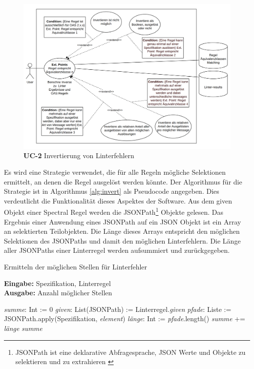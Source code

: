 \begin{figure}[htbp]
  \centering
  \includegraphics[width=1\linewidth]{img/invert.png}
  \caption{\textbf{UC-2} Invertierung von Linterfehlern}
  \label{fig:UC2}
\end{figure}

\newpage
Es wird eine Strategie verwendet, die für alle Regeln mögliche Selektionen ermittelt, an denen die Regel ausgelöst werden könnte. Der Algorithmus für die Strategie ist in Algorithmus \ref{alg:invert} als Pseudocode angegeben. Dies verdeutlicht die Funktionalität dieses Aspektes der Software. Aus dem given Objekt einer Spectral Regel werden die JSONPath\footnote{JSONPath ist eine deklarative Abfragesprache, \acs{JSON} Werte und Objekte zu selektieren und zu extrahieren \parencite{friesen_extracting_2019}} Objekte gelesen. Das Ergebnis einer Anwendung eines JSONPath auf ein \acs{JSON} Objekt ist ein Array an selektierten Teilobjekten. Die Länge dieses Arrays entspricht den möglichen Selektionen des JSONPaths und damit den möglichen Linterfehlern. Die Länge aller JSONPaths einer Linterregel werden aufsummiert und zurückgegeben.

\begin{algorithm}
  \caption{Ermitteln der möglichen Stellen für Linterfehler}
  \label{alg:invert}
  \textbf{Eingabe:} Spezifikation, Linterregel \\
  \textbf{Ausgabe:} Anzahl möglicher Stellen
\begin{algorithmic}[1]
    \State \textit{summe}: Int := 0
    \State \textit{given}: List(JSONPath) := Linterregel.\textit{given}
        \State \textit{pfade}: Liste := JSONPath.apply(Spezifikation, \textit{element})
        \State \textit{länge}: Int := \textit{pfade}.length()
        \State \textit{summe} += \textit{länge}
    \EndFor
    \State \Return \textit{summe}
\end{algorithmic}
\end{algorithm}


